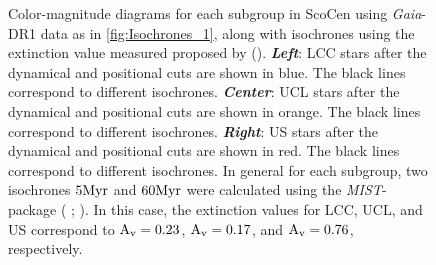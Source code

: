 \begin{figure}[!ht]
\centering
\caption{\scriptsize{Color-magnitude diagrams for each subgroup in ScoCen using \textit{Gaia}-DR1 data as in \autoref{fig:Isochrones_1}, along with isochrones using the extinction value measured proposed by  (\citeyear{1989A&A...216...44D}). \textit{\textbf{Left}}: LCC stars after the dynamical and positional cuts are shown in blue. The black lines correspond to different isochrones. \textit{\textbf{Center}}: UCL stars after the dynamical and positional cuts are shown in orange. The black lines correspond to different isochrones. \textit{\textbf{Right}}: US stars after the dynamical and positional cuts are shown in red. The black lines correspond to different isochrones. In general for each subgroup, two isochrones $5 \textnormal{Myr}$ and $60 \textnormal{Myr}$ were calculated using the \textit{MIST}-package ( \citeyear{2016ApJS..222....8D};  \citeyear{2016ApJ...823..102C}). In this case, the extinction values for LCC, UCL, and US correspond to $\textnormal{A}_\textnormal{v} = 0.23$, $\textnormal{A}_\textnormal{v} = 0.17$, and $\textnormal{A}_\textnormal{v} = 0.76$, respectively.}}
\label{fig:Isochrones_3}
\end{figure}

